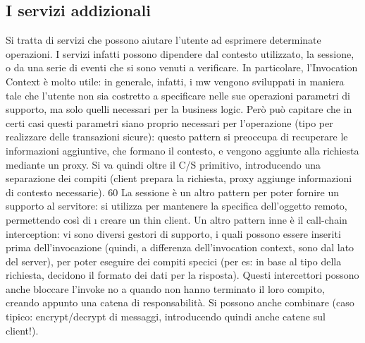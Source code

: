 \subsection{I servizi addizionali}
Si tratta di servizi che possono aiutare l'utente ad esprimere determinate operazioni. I servizi infatti possono
dipendere dal contesto utilizzato, la sessione, o
da una serie di eventi che si sono venuti a verificare.
In particolare, l'Invocation Context è molto utile: in generale, infatti, i mw
vengono sviluppati in maniera tale che l'utente non sia costretto a specificare
nelle sue operazioni parametri di supporto, ma solo quelli necessari per la business logic. Però può capitare che in
certi casi questi parametri siano proprio
necessari per l'operazione (tipo per realizzare delle transazioni sicure): questo
pattern si preoccupa di recuperare le informazioni aggiuntive, che formano il
contesto, e vengono aggiunte alla richiesta mediante un proxy. Si va quindi
oltre il C/S primitivo, introducendo una separazione dei compiti (client prepara
la richiesta, proxy aggiunge informazioni di contesto necessarie).
60
La sessione è un altro pattern per poter fornire un supporto al servitore:
si utilizza per mantenere la specifica dell'oggetto remoto, permettendo così di
\i{}
creare un thin client.
Un altro pattern inne è il call-chain interception: vi sono diversi gestori
di supporto, i quali possono essere inseriti prima dell'invocazione (quindi, a
differenza dell'invocation context, sono dal lato del server), per poter eseguire
dei compiti specici (per es: in base al tipo della richiesta, decidono il formato
dei dati per la risposta). Questi intercettori possono anche bloccare l'invoke no
a quando non hanno terminato il loro compito, creando appunto una catena di
responsabilità. Si possono anche combinare (caso tipico: encrypt/decrypt di
messaggi, introducendo quindi anche catene sul client!).
